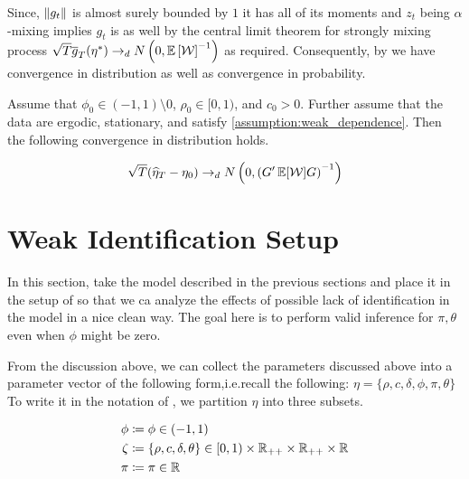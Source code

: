 \documentclass[11pt, letterpaper, twoside, final]{article}
\begin{document}
Since, $\norm*{g_t}$ is almost surely bounded by $1$ it has all of its moments and $z_t$ being $\alpha$-mixing
implies $g_t$ is as well by the central limit theorem for strongly mixing process 
$\sqrt{T} \sampmom(\eta^{*}) \dto \N\left(0, \E\left[\W\right]^{-1}\right)$ as required. 
Consequently, by \textcite[theorem 3.2]{newey1994large} we have convergence in distribution as well as convergence
in probability.

\begin{theorem}
    Assume that $\phi_0  \in (-1,1) \setminus 0$, $\rho_0 \in [0,1)$, and $c_0 > 0$. 
    Further assume that the data are ergodic, stationary, and satisfy \cref{assumption:weak_dependence}.
    Then the following convergence in distribution holds.

    \begin{equation}
    \sqrt{T} (\widehat{\eta}_T - \eta_0) \dto \N\left(0, \left(G' \E[\W] G\right)^{-1}\right)
    \end{equation}
\end{theorem}





\section{Weak Identification Setup}

In this section, take the model described in the previous sections and place it in the setup of
\textcite{andrews2014Gmm} so that we ca analyze the effects of possible lack of identification in the model in a
nice clean way.
The goal here is to perform valid inference for $\pi, \theta$ even when $\phi$ might be zero. 


From the discussion above, we can collect the parameters discussed above into a parameter vector of the following
form,i.e.\@ recall the following: $\eta = \lbrace \rho, c, \delta, \phi, \pi, \theta \rbrace$
To write it in the notation of \textcite{andrews2014Gmm}, we partition $\eta$ into three subsets.

\begin{align}
    \phi &\coloneqq \phi  \in (-1, 1) \\ 
    \zeta &\coloneqq \lbrace \rho, c, \delta, \theta \rbrace \in [0,1) \times \R_{++} \times \R_{++} \times
    \R  \\
    \pi &\coloneqq \pi \in \R 
\end{align}
\end{document}
